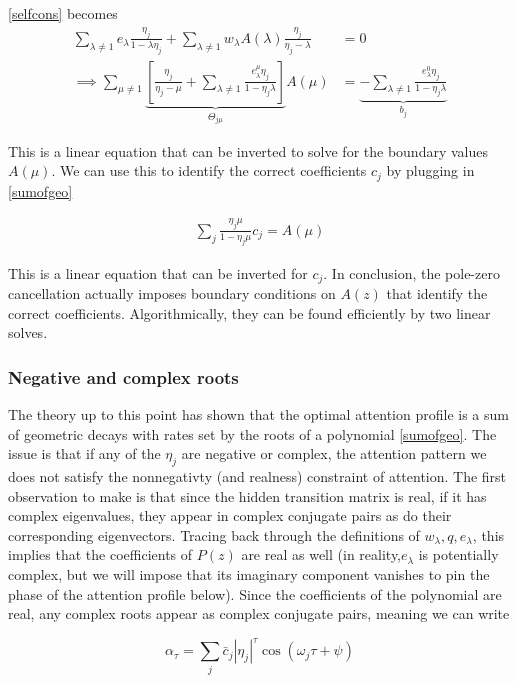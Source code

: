 \documentclass{article}
\begin{document}
\eqref{selfcons} becomes
\begin{align}
    \sum_{\lambda\neq 1}e_{\lambda} \frac{\eta_j}{1-\lambda \eta_j} + \sum_{\lambda\neq 1}w_{\lambda} A(\lambda) \frac{\eta_j}{\eta_j - \lambda} &= 0\\
    \implies \sum_{\mu\neq1} \underbrace{\left[\frac{\eta_j}{\eta_j-\mu} + \sum_{\lambda\neq 1}\frac{e^\mu_\lambda\eta_j}{1-\eta_j\lambda} \right]}_{\Theta_{j\mu}}A(\mu) &= \underbrace{-\sum_{\lambda\neq 1}\frac{e_\lambda^0\eta_j}{1-\eta_j\lambda}}_{b_j}
\end{align}

This is a linear equation that can be inverted to solve for the boundary values $A(\mu)$. We can use this to identify the correct coefficients $c_j$ by plugging in \eqref{sumofgeo}

\begin{align}
  \sum_{j}\frac{\eta_j \mu}{1-\eta_j\mu} c_j = A(\mu)
\end{align}

This is a linear equation that can be inverted for $c_j$. In conclusion, the pole-zero cancellation actually imposes boundary conditions on $A(z)$ that identify the correct coefficients. Algorithmically, they can be found efficiently by two linear solves. 

\subsubsection{Negative and complex roots}
The theory up to this point has shown that the optimal attention profile is a sum of geometric decays with rates set by the roots of a polynomial \eqref{sumofgeo}. The issue is that if any of the $\eta_j$ are negative or complex, the attention pattern we does not satisfy the nonnegativty (and realness) constraint of attention. The first observation to make is that since the hidden transition matrix is real, if it has complex eigenvalues, they appear in complex conjugate pairs as do their corresponding eigenvectors. Tracing back through the definitions of $w_\lambda, q, e_\lambda$, this implies that the coefficients of $P(z)$ are real as well (in reality,$e_\lambda$ is potentially complex, but we will impose that its imaginary component vanishes to pin the phase of the attention profile below). Since the coefficients of the polynomial are real, any complex roots appear as complex conjugate pairs, meaning we can write

\begin{equation}
    \alpha_\tau = \sum_j \bar{c}_j |\eta_j|^{\tau}\cos(\omega_j \tau + \psi)
\end{equation}
\end{document}
